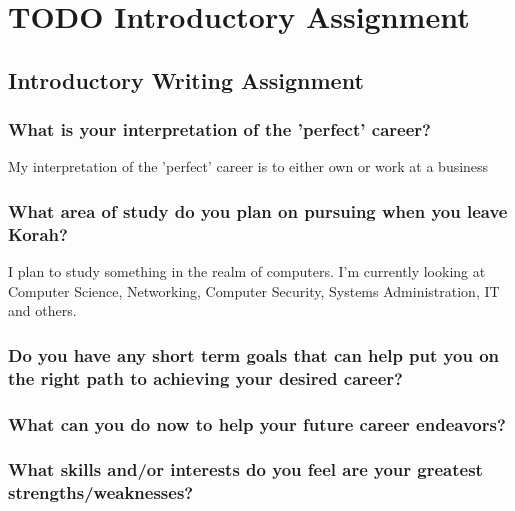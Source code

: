 \documentclass[11pt]{article}
\date{\today}
\title{}
\begin{document}
\tableofcontents


\section{{\bfseries\sffamily TODO} Introductory Assignment}
\label{sec:org88ce99e}

\subsection{Introductory Writing Assignment}
\label{sec:org732e0a2}

\subsubsection{What is your interpretation of the 'perfect' career?}
\label{sec:org86bd7a8}

My interpretation of the 'perfect' career is to either own or work at a business 

\subsubsection{What area of study do you plan on pursuing when you leave Korah?}
\label{sec:orgc2bba4a}

I plan to study something in the realm of computers. I'm currently looking at Computer Science, Networking, Computer Security, Systems Administration, IT and others.

\subsubsection{Do you have any short term goals that can help put you on the right path to achieving your desired career?}
\label{sec:orgb81859b}

\subsubsection{What can you do now to help your future career endeavors?}
\label{sec:org1b5ded9}

\subsubsection{What skills and/or interests do you feel are your greatest strengths/weaknesses?}
\label{sec:orgee61846}
\end{document}
